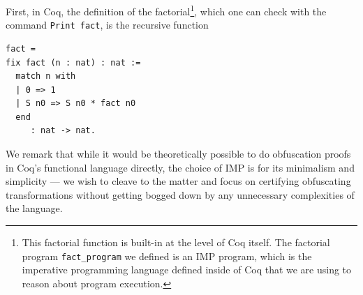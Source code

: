 \documentclass[12pt,notitlepage]{report}
\theoremstyle{plain}
\theoremstyle{definition}
\numberwithin{equation}{section}
\begin{document}
    First, in Coq, the definition of the factorial\footnote{This factorial function is built-in at the level of Coq itself.  The factorial program \texttt{fact\_program} we defined is an IMP program, which is the imperative programming language defined inside of Coq that we are using to reason about program execution.}, which one can check with the command \verb$Print fact$, is the recursive function
    \begin{verbatim}
fact = 
fix fact (n : nat) : nat :=
  match n with
  | 0 => 1
  | S n0 => S n0 * fact n0
  end
     : nat -> nat.\end{verbatim}
    \par \indent We remark that while it would be theoretically possible to do obfuscation proofs in Coq's functional language directly, the choice of IMP is for its minimalism and simplicity --- we wish to cleave to the matter and focus on certifying obfuscating transformations without getting bogged down by any unnecessary complexities of the language.
\end{document}
